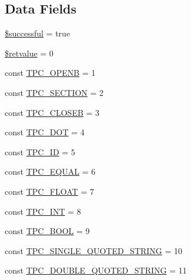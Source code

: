 \subsection*{Data Fields}
\begin{DoxyCompactItemize}
\item 
\hyperlink{class_smarty___internal___configfileparser_abdc0098b3ead0fb819e232570620128d}{\$successful} = true
\item 
\hyperlink{class_smarty___internal___configfileparser_ac7a3e22778442d5fd9455d1635b5c0b0}{\$retvalue} = 0
\item 
const \hyperlink{class_smarty___internal___configfileparser_adcedff1bc4abd17497bc76b900379d85}{T\+P\+C\+\_\+\+O\+P\+E\+N\+B} = 1
\item 
const \hyperlink{class_smarty___internal___configfileparser_af75a689d179c2be6b93da8c28e17041e}{T\+P\+C\+\_\+\+S\+E\+C\+T\+I\+O\+N} = 2
\item 
const \hyperlink{class_smarty___internal___configfileparser_af1fc03a905e8697bc8b3c48e46b20e7e}{T\+P\+C\+\_\+\+C\+L\+O\+S\+E\+B} = 3
\item 
const \hyperlink{class_smarty___internal___configfileparser_a62233dc8093cf8d1cb3d24a08b290f7d}{T\+P\+C\+\_\+\+D\+O\+T} = 4
\item 
const \hyperlink{class_smarty___internal___configfileparser_ae68c842129cac5f826b71790a548d239}{T\+P\+C\+\_\+\+I\+D} = 5
\item 
const \hyperlink{class_smarty___internal___configfileparser_a32bdcd233287108e79d24050c630cf74}{T\+P\+C\+\_\+\+E\+Q\+U\+A\+L} = 6
\item 
const \hyperlink{class_smarty___internal___configfileparser_a74ae7267190ee75af4c4406ef7b479a6}{T\+P\+C\+\_\+\+F\+L\+O\+A\+T} = 7
\item 
const \hyperlink{class_smarty___internal___configfileparser_a6f6c243024c1fd94ac8d20f257d166be}{T\+P\+C\+\_\+\+I\+N\+T} = 8
\item 
const \hyperlink{class_smarty___internal___configfileparser_a63058f79a0f23504b4ad48f7de658839}{T\+P\+C\+\_\+\+B\+O\+O\+L} = 9
\item 
const \hyperlink{class_smarty___internal___configfileparser_a7f2c209401f03ba67f5eeb1b84dff746}{T\+P\+C\+\_\+\+S\+I\+N\+G\+L\+E\+\_\+\+Q\+U\+O\+T\+E\+D\+\_\+\+S\+T\+R\+I\+N\+G} = 10
\item 
const \hyperlink{class_smarty___internal___configfileparser_a0739cc57585d39ac2cece409d0a07608}{T\+P\+C\+\_\+\+D\+O\+U\+B\+L\+E\+\_\+\+Q\+U\+O\+T\+E\+D\+\_\+\+S\+T\+R\+I\+N\+G} = 11
\item 

\end{DoxyCompactItemize}
